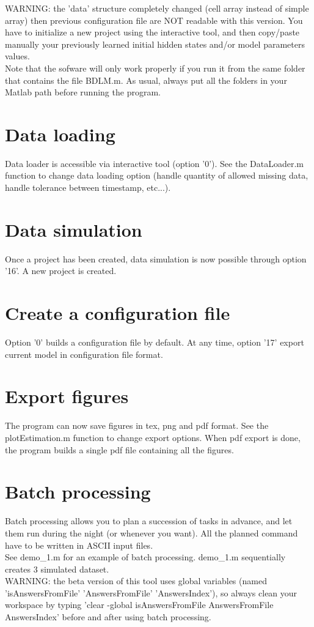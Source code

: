 \documentclass{book}
\begin{document}
WARNING: the 'data' structure completely changed (cell array instead of simple array) then previous configuration file are NOT readable with this version. You have to initialize a new project using the interactive tool, and then copy/paste manually your previously learned initial hidden states and/or model parameters values.\\

Note that the sofware will only work properly if you run it from the same folder that contains the file BDLM.m.
As usual, always put all the folders in your Matlab path before running the program.

\section{Data loading}
Data loader is accessible via interactive tool (option '0').
See the DataLoader.m function to change data loading option (handle quantity of allowed missing data, handle tolerance between timestamp, etc...).

\section{Data simulation}
Once a project has been created, data simulation is now possible through option '16'.
A new project is created.

\section{Create a configuration file}
Option '0' builds a configuration file by default.
At any time, option '17' export current model in configuration file format.

\section{Export figures}
The program can now save figures in tex, png and pdf format.
See the plotEstimation.m function to change export options.
When pdf export is done, the program builds a single pdf file containing all the figures.

\section{Batch processing}

Batch processing allows you to plan a succession of tasks in advance, and let them run during the night (or whenever you want).
All the planned command have to be written in ASCII input files.\\

See demo\_1.m for an example of batch processing. demo\_1.m sequentially creates 3 simulated dataset.\\

WARNING: the beta version of this tool uses global variables (named 'isAnswersFromFile' 'AnswersFromFile' 'AnswersIndex'), so always clean your workspace by typing 'clear -global isAnswersFromFile AnswersFromFile AnswersIndex' before and after using batch processing.

\newpage
\end{document}
